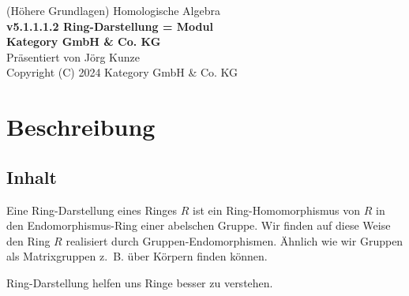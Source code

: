 \documentclass[a4paper]{amsart}
\theoremstyle{definition}
\newcommand{\zb}{z.~B. }
\begin{document}
\begin{titlepage}
\centering
{\huge
(Höhere Grundlagen) Homologische Algebra\\[1cm]
\textbf{v5.1.1.1.2 Ring-Darstellung = Modul}
}\\[1cm]

\textbf{Kategory GmbH \& Co. KG}\\
Präsentiert von Jörg Kunze\\
Copyright (C) 2024 Kategory GmbH \& Co. KG

\end{titlepage}

%

\newpage

\section*{Beschreibung}

\subsection*{Inhalt}
Eine Ring-Darstellung eines Ringes $R$ ist ein Ring-Homomorphismus von $R$ in den Endomorphismus-Ring einer abelschen Gruppe. Wir finden auf diese Weise den Ring $R$ realisiert durch Gruppen-Endomorphismen. Ähnlich wie wir Gruppen als Matrixgruppen \zb über Körpern finden können.

Ring-Darstellung helfen uns Ringe besser zu verstehen. 
\end{document}
